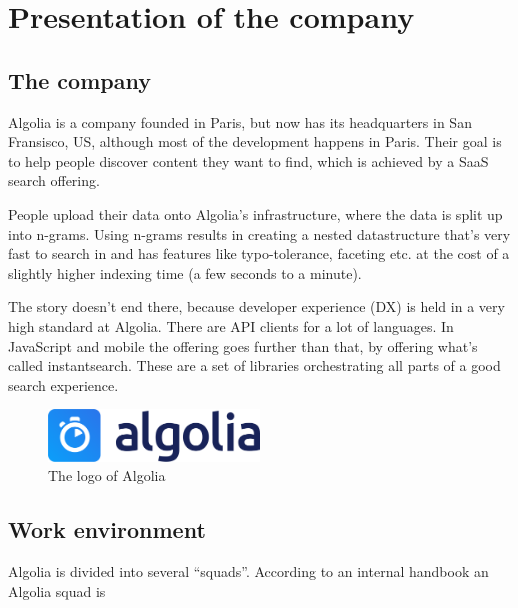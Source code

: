 
\chapter{Presentation of the company} %
\label{chp:presentation}

\section{The company} %
\label{sec:company}

Algolia\cite{algolia-home} is a company founded in Paris, but now has its headquarters in San Fransisco, US, although most of the development happens in Paris. Their goal is to help people discover content they want to find, which is achieved by a SaaS search offering.

People upload their data onto Algolia’s infrastructure, where the data is split up into n-grams\cite{kimbrell1988searching}. Using n-grams results in creating a nested datastructure that’s very fast to search in and has features like typo-tolerance, faceting etc. at the cost of a slightly higher indexing time (a few seconds to a minute).\cite{paris-nlp-algolia}

The story doesn’t end there, because developer experience (DX) is held in a very high standard at Algolia. There are API clients for a lot of languages\cite{doc-api-clients}. In JavaScript and mobile the offering goes further than that, by offering what’s called instantsearch\cite{instantsearch-js, react-instantsearch, instantsearch-android, instantsearch-ios}. These are a set of libraries orchestrating all parts of a good search experience.

\begin{figure}[H]
  \label{figure:company-logo}
  \centering
  \includegraphics[width=0.5\textwidth]{../assets/algolia-logo-light.pdf}
  \caption{The logo of Algolia \cite{algolia-press}}
\end{figure}

\section{Work environment}
\label{sec:work-environment}

Algolia is divided into several ``squads''. According to an internal handbook an Algolia squad is

